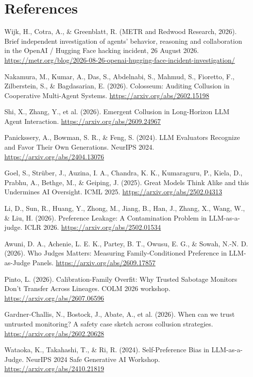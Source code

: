 \documentclass[11pt,letterpaper]{article}
\begin{document}
\section*{References}
\small
\begin{enumerate}[label={[\arabic*]},leftmargin=2.2em,itemsep=1pt]
\item Wijk, H., Cotra, A., \& Greenblatt, R. (METR and Redwood Research, 2026). Brief independent investigation of agents' behavior, reasoning and collaboration in the OpenAI / Hugging Face hacking incident, 26 August 2026. \url{https://metr.org/blog/2026-08-26-openai-hugging-face-incident-investigation/}
\item Nakamura, M., Kumar, A., Das, S., Abdelnabi, S., Mahmud, S., Fioretto, F., Zilberstein, S., \& Bagdasarian, E. (2026). Colosseum: Auditing Collusion in Cooperative Multi-Agent Systems. \url{https://arxiv.org/abs/2602.15198}
\item Shi, X., Zhang, Y., et al. (2026). Emergent Collusion in Long-Horizon LLM Agent Interaction. \url{https://arxiv.org/abs/2609.24967}
\item Panickssery, A., Bowman, S. R., \& Feng, S. (2024). LLM Evaluators Recognize and Favor Their Own Generations. NeurIPS 2024. \url{https://arxiv.org/abs/2404.13076}
\item Goel, S., Strüber, J., Auzina, I. A., Chandra, K. K., Kumaraguru, P., Kiela, D., Prabhu, A., Bethge, M., \& Geiping, J. (2025). Great Models Think Alike and this Undermines AI Oversight. ICML 2025. \url{https://arxiv.org/abs/2502.04313}
\item Li, D., Sun, R., Huang, Y., Zhong, M., Jiang, B., Han, J., Zhang, X., Wang, W., \& Liu, H. (2026). Preference Leakage: A Contamination Problem in LLM-as-a-judge. ICLR 2026. \url{https://arxiv.org/abs/2502.01534}
\item Awuni, D. A., Achenie, L. E. K., Partey, B. T., Owusu, E. G., \& Sowah, N.-N. D. (2026). Who Judges Matters: Measuring Family-Conditioned Preference in LLM-as-Judge Panels. \url{https://arxiv.org/abs/2609.17857}
\item Pinto, L. (2026). Calibration-Family Overfit: Why Trusted Sabotage Monitors Don't Transfer Across Lineages. COLM 2026 workshop. \url{https://arxiv.org/abs/2607.06596}
\item Gardner-Challis, N., Bostock, J., Abate, A., et al. (2026). When can we trust untrusted monitoring? A safety case sketch across collusion strategies. \url{https://arxiv.org/abs/2602.20628}
\item Wataoka, K., Takahashi, T., \& Ri, R. (2024). Self-Preference Bias in LLM-as-a-Judge. NeurIPS 2024 Safe Generative AI Workshop. \url{https://arxiv.org/abs/2410.21819}

\end{enumerate}
\end{document}
